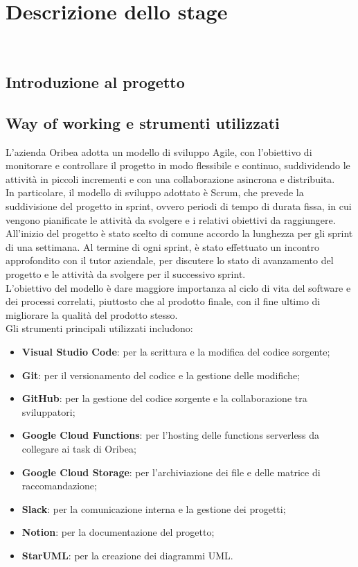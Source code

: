 \chapter{Descrizione dello stage}
\label{cap:descrizione-stage}

\\

\section{Introduzione al progetto}


\section{Way of working e strumenti utilizzati}
\label{sec:way-of-working}

L’azienda Oribea adotta un modello di sviluppo Agile, con l’obiettivo di monitorare e controllare il progetto in modo flessibile e continuo, suddividendo le attività in piccoli incrementi e con una collaborazione asincrona e distribuita.\\
In particolare, il modello di sviluppo adottato è Scrum, che prevede la suddivisione del progetto in sprint, ovvero periodi di tempo di durata fissa, in cui vengono pianificate le attività da svolgere e i relativi obiettivi da raggiungere. All'inizio del progetto è stato scelto di comune accordo la lunghezza per gli sprint di una settimana. Al termine di ogni sprint, è stato effettuato un incontro approfondito con il tutor aziendale, per discutere lo stato di avanzamento del progetto e le attività da svolgere per il successivo sprint.\\
L’obiettivo del modello è dare maggiore importanza al ciclo di vita del software e dei processi correlati, piuttosto che al prodotto finale, con il fine ultimo di migliorare la qualità del prodotto stesso.\\

Gli strumenti principali utilizzati includono:
\begin{itemize}
    \item \textbf{Visual Studio Code}: per la scrittura e la modifica del codice sorgente;
    \item \textbf{Git}: per il versionamento del codice e la gestione delle modifiche;
    \item \textbf{GitHub}: per la gestione del codice sorgente e la collaborazione tra sviluppatori;
    \item \textbf{Google Cloud Functions}: per l'hosting delle functions serverless da collegare ai task di Oribea;
    \item \textbf{Google Cloud Storage}: per l'archiviazione dei file e delle matrice di raccomandazione;
    \item \textbf{Slack}: per la comunicazione interna e la gestione dei progetti;
    \item \textbf{Notion}: per la documentazione del progetto;
    \item \textbf{StarUML}: per la creazione dei diagrammi UML.
\end{itemize}

